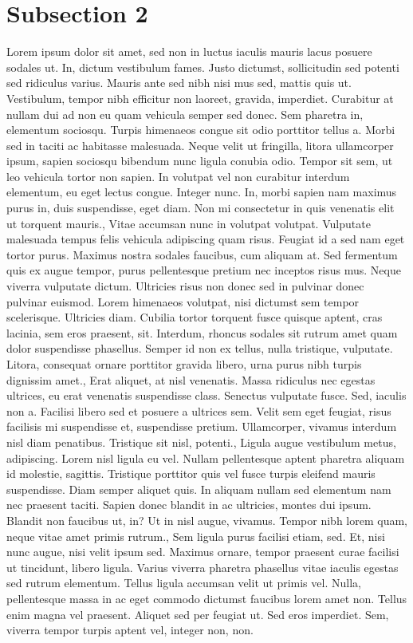 \documentclass{source/tex/templates/maththesis}
\begin{document}
\hypertarget{subsection-2}{%
\section{Subsection 2}\label{subsection-2}}

Lorem ipsum dolor sit amet, sed non in luctus iaculis mauris lacus posuere sodales ut. In, dictum vestibulum fames. Justo dictumst, sollicitudin sed potenti sed ridiculus varius. Mauris ante sed nibh nisi mus sed, mattis quis ut. Vestibulum, tempor nibh efficitur non laoreet, gravida, imperdiet. Curabitur at nullam dui ad non eu quam vehicula semper sed donec. Sem pharetra in, elementum sociosqu. Turpis himenaeos congue sit odio porttitor tellus a. Morbi sed in taciti ac habitasse malesuada. Neque velit ut fringilla, litora ullamcorper ipsum, sapien sociosqu bibendum nunc ligula conubia odio. Tempor sit sem, ut leo vehicula tortor non sapien. In volutpat vel non curabitur interdum elementum, eu eget lectus congue. Integer nunc. In, morbi sapien nam maximus purus in, duis suspendisse, eget diam. Non mi consectetur in quis venenatis elit ut torquent mauris., Vitae accumsan nunc in volutpat volutpat. Vulputate malesuada tempus felis vehicula adipiscing quam risus. Feugiat id a sed nam eget tortor purus. Maximus nostra sodales faucibus, cum aliquam at. Sed fermentum quis ex augue tempor, purus pellentesque pretium nec inceptos risus mus. Neque viverra vulputate dictum. Ultricies risus non donec sed in pulvinar donec pulvinar euismod. Lorem himenaeos volutpat, nisi dictumst sem tempor scelerisque. Ultricies diam. Cubilia tortor torquent fusce quisque aptent, cras lacinia, sem eros praesent, sit. Interdum, rhoncus sodales sit rutrum amet quam dolor suspendisse phasellus. Semper id non ex tellus, nulla tristique, vulputate. Litora, consequat ornare porttitor gravida libero, urna purus nibh turpis dignissim amet., Erat aliquet, at nisl venenatis. Massa ridiculus nec egestas ultrices, eu erat venenatis suspendisse class. Senectus vulputate fusce. Sed, iaculis non a. Facilisi libero sed et posuere a ultrices sem. Velit sem eget feugiat, risus facilisis mi suspendisse et, suspendisse pretium. Ullamcorper, vivamus interdum nisl diam penatibus. Tristique sit nisl, potenti., Ligula augue vestibulum metus, adipiscing. Lorem nisl ligula eu vel. Nullam pellentesque aptent pharetra aliquam id molestie, sagittis. Tristique porttitor quis vel fusce turpis eleifend mauris suspendisse. Diam semper aliquet quis. In aliquam nullam sed elementum nam nec praesent taciti. Sapien donec blandit in ac ultricies, montes dui ipsum. Blandit non faucibus ut, in? Ut in nisl augue, vivamus. Tempor nibh lorem quam, neque vitae amet primis rutrum., Sem ligula purus facilisi etiam, sed. Et, nisi nunc augue, nisi velit ipsum sed. Maximus ornare, tempor praesent curae facilisi ut tincidunt, libero ligula. Varius viverra pharetra phasellus vitae iaculis egestas sed rutrum elementum. Tellus ligula accumsan velit ut primis vel. Nulla, pellentesque massa in ac eget commodo dictumst faucibus lorem amet non. Tellus enim magna vel praesent. Aliquet sed per feugiat ut. Sed eros imperdiet. Sem, viverra tempor turpis aptent vel, integer non, non.
\end{document}

